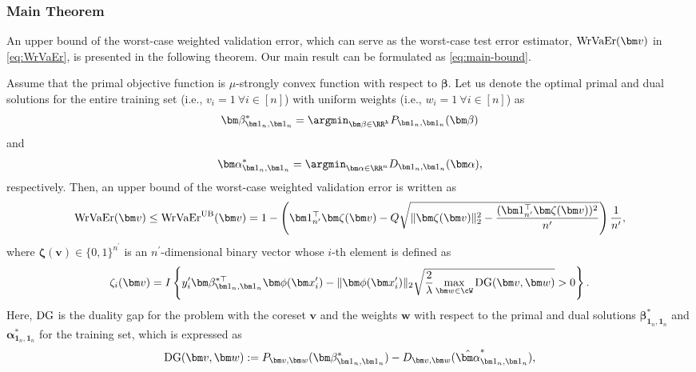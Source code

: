 \subsubsection{Main Theorem}
%
An upper bound of the worst-case weighted validation error, which can serve as the worst-case test error estimator, $ {\rm WrVaEr}(\bm v) $ in \eqref{eq:WrVaEr}, is presented in the following theorem. Our main result can be formulated as \eqref{eq:main-bound}.
%
\begin{theorem}
 \label{theo:main}
 {Assume that the primal objective function is $\mu$-strongly convex function with respect to $\bm \beta$.}
 Let us denote the optimal primal and dual solutions for the entire training set (i.e., $v_i = 1 ~ \forall i \in [n]$) with uniform weights (i.e., $w_i = 1 ~ \forall i \in [n]$) as
 \begin{align*}
  \bm \beta^*_{\bm 1_n, \bm 1_n} = \argmin_{\bm \beta \in \RR^k} P_{\bm 1_n, \bm 1_n}(\bm \beta)
 \end{align*}
 and 
 \begin{align*}
  \bm \alpha^*_{\bm 1_n, \bm 1_n} = \argmin_{\bm \alpha \in \RR^n} D_{\bm 1_n, \bm 1_n}(\bm \alpha),
 \end{align*}
 respectively.
 Then, an upper bound of the worst-case weighted validation error is written as 
 \begin{align}
  \label{eq:main-bound}
  {\rm WrVaEr}(\bm v)
  \le
  {\rm WrVaEr}^{\rm UB}(\bm v)
  =
  1
  -
  \left(
  \bm 1_{n^\prime}^\top \bm \zeta(\bm v)
  -
  Q
  \sqrt{
  \|\bm \zeta(\bm v)\|_2^2
  -
  \frac{
  (\bm 1_{n^\prime}^\top \bm \zeta(\bm v))^2
  }{
  n^\prime
  }
  }
  \right)
  \frac{1}{n^\prime},
 \end{align}
 where
 $\bm \zeta(\bm v) \in \{0, 1\}^{n^\prime}$
 is an $n^\prime$-dimensional binary vector whose $i$-th element is defined as
 \begin{align}
  \label{eq:zeta}
  \zeta_i(\bm v)
  =
  I\left\{
  y_i^\prime \bm \beta_{\bm 1_n, \bm 1_n}^{*\top} \bm \phi(\bm x_i^\prime) - \|\bm \phi(\bm x_i^\prime)\|_2 \sqrt{\frac{2}{\lambda} \max_{\bm w \in \cW} {\rm DG}(\bm v, \bm w)} > 0
  \right\}.
 \end{align}
 Here, ${\rm DG}$ is the duality gap for the problem with the coreset $\bm v$ and the weights $\bm w$ with respect to the primal and dual solutions $\bm \beta^*_{\bm 1_n, \bm 1_n}$ and $\bm \alpha^*_{\bm 1_n, \bm 1_n}$ for the training set, which is expressed as  
\begin{align}
 \label{eq:duality_gap}
{\rm DG}(\bm v, \bm w) := P_{\bm v, \bm w}(\bm \beta^*_{\bm 1_n, \bm 1_n}) - D_{\bm v, \bm w}(\hat{\bm \alpha}_{\bm 1_n, \bm 1_n}^{*}),

\end{align}
\end{theorem}
